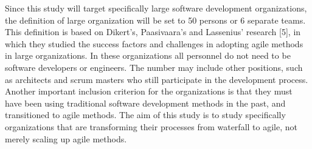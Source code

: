 Since this study will target specifically large software development
organizations, the definition of large organization will be set to 50
persons or 6 separate teams. This definition is based on Dikert's,
Paasivaara's and Lassenius' research [5], in which they studied
the success factors and challenges in adopting agile methods in large
organizations. In these organizations all personnel do not need to
be software developers or engineers. The number may include other
positions, such as architects and scrum masters who still participate
in the development process. Another important inclusion criterion for
the organizations is that they must have been using traditional software
development methods in the past, and transitioned to agile methods.
The aim of this study is to study specifically organizations that are
transforming their processes from waterfall to agile, not merely scaling
up agile methods.
